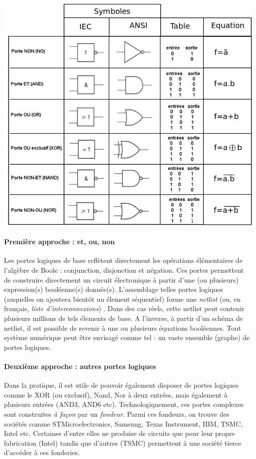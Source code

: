 \begin{center}
\includegraphics[scale=0.4]{./figures/table_verite.png}
\end{center}

\paragraph{Première approche : et, ou, non}
Les portes logiques de base reflètent directement les opérations élémentaires de l'algèbre de Boole : conjunction, disjonction et
négation. Ces portes permettent de construire directement un circuit électronique à partir d'une (ou plusieurs) expression(s) booléenne(s) donnée(s). L'assemblage
telles portes logiques (auquelles on ajoutera bientôt un élement séquentiel) forme une {\it netlist} (ou, en français, {\it liste d'interconnexions})
. Dans des cas réels, cette netlist peut contenir plusieurs millions de tels élements de base. A l'inverse, à partir d'un schéma de
netlist, il est possible de revenir à une ou plusieurs équations booléennes. Tout système numérique peut être envisagé comme tel : un vaste ensemble (graphe) de portes logiques.

\paragraph{Deuxième approche : autres portes logiques}
Dans la pratique, il est utile de pouvoir également disposer de portes logiques comme le XOR (ou exclusif), Nand, Nor à deux  entrées, mais également à plusieurs entrées (AND3, AND6 etc).
Technologiquement, ces portes complexes sont construites {\it à façon} par un {\it fondeur}. Parmi ces fondeurs, on trouve des sociétés comme STMicroelectronics, Samsung, Texas Instrument, IBM, TSMC, Intel etc.
Certaines d'entre elles ne produise de circuits que pour leur propre fabrication (Intel) tandis que d'autres (TSMC) permettent à une société tierce d'accéder à ces fonderies.

